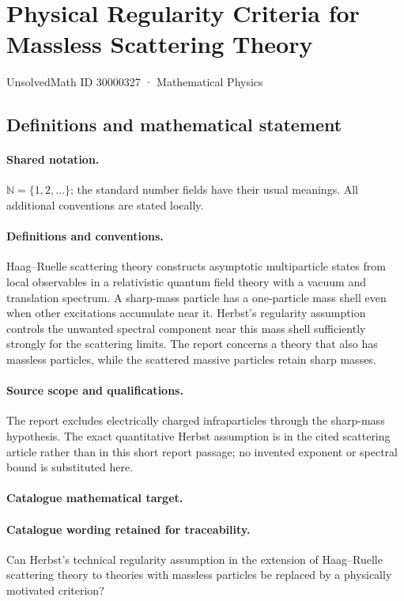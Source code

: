 \documentclass[11pt]{article}
\begin{document}
\setcounter{section}{30000326}
\section{Physical Regularity Criteria for Massless Scattering Theory}\label{30000327}
{\small UnsolvedMath ID 30000327 · Mathematical Physics}
\subsection{Definitions and mathematical statement}

\paragraph{Shared notation.}$\mathbb N=\{1,2,\ldots\}$; the standard number fields have their usual meanings. All additional conventions are stated locally.


\paragraph{Definitions and conventions.} Haag--Ruelle scattering theory constructs asymptotic multiparticle states from local observables in a relativistic quantum field theory with a vacuum and translation spectrum. A sharp-mass particle has a one-particle mass shell even when other excitations accumulate near it. Herbst's regularity assumption controls the unwanted spectral component near this mass shell sufficiently strongly for the scattering limits. The report concerns a theory that also has massless particles, while the scattered massive particles retain sharp masses.

\paragraph{Source scope and qualifications.} The report excludes electrically charged infraparticles through the sharp-mass hypothesis. The exact quantitative Herbst assumption is in the cited scattering article rather than in this short report passage; no invented exponent or spectral bound is substituted here.

\paragraph{Catalogue mathematical target.}
\paragraph{Catalogue wording retained for traceability.}
Can Herbst's technical regularity assumption in the extension of Haag–Ruelle scattering theory to theories with massless particles be replaced by a physically motivated criterion?
\end{document}
